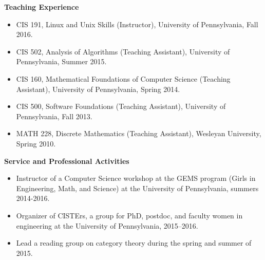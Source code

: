 \documentclass[letterpaper,11pt]{article}
\makeatletter
\newcommand{\resitem}[1]{\item #1 \vspace{-2pt}}
\newcommand{\resheading}[1]{{\large \colorbox{mygrey}{\begin{minipage}{\textwidth}{\textbf{#1 \vphantom{p\^{E}}}}\end{minipage}}}}
\newcommand{\ressubheading}[4]{
\begin{tabular*}{7in}{l@{\extracolsep{\fill}}r} 
		\textbf{#1} & #2 \\
		\textit{#3} & \textit{#4} \\
\end{tabular*}\vspace{-2pt}}
\makeatother
\begin{document}
\newpage
\resheading{Teaching Experience}
\begin{itemize}
    \item{CIS 191, Linux and Unix Skills (Instructor),
        University of Pennsylvania, Fall 2016.}


    \item{CIS 502, Analysis of Algorithms (Teaching Assistant),
        University of Pennsylvania, Summer 2015.}

    \item{CIS 160, Mathematical Foundations of Computer Science (Teaching
        Assistant),
        University of Pennsylvania, Spring 2014.}

    \item{CIS 500, Software Foundations (Teaching Assistant),
        University of Pennsylvania, Fall 2013.}

    \item{MATH 228, Discrete Mathematics (Teaching Assistant),
        Wesleyan University, Spring 2010.}

        


\end{itemize}
\vspace{7pt}


\resheading{Service and Professional Activities}
\begin{itemize}

\item{Instructor of a Computer Science workshop at the GEMS program (Girls in
    Engineering, Math, and Science) at the University of Pennsylvania, summers
    2014-2016.}


    \item{Organizer of CISTErs, a group for PhD, postdoc, and faculty
        women in engineering at the University of Pennsylvania, 2015--2016.}

    \item{Lead a reading group on category theory during the spring and summer
        of 2015.}
\end{itemize}
\end{document}

